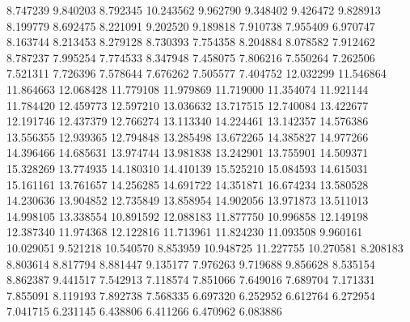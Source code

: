 8.747239
9.840203
8.792345
10.243562
9.962790
9.348402
9.426472
9.828913
8.199779
8.692475
8.221091
9.202520
9.189818
7.910738
7.955409
6.970747
8.163744
8.213453
8.279128
8.730393
7.754358
8.204884
8.078582
7.912462
8.787237
7.995254
7.774533
8.347948
7.458075
7.806216
7.550264
7.262506
7.521311
7.726396
7.578644
7.676262
7.505577
7.404752
12.032299
11.546864
11.864663
12.068428
11.779108
11.979869
11.719000
11.354074
11.921144
11.784420
12.459773
12.597210
13.036632
13.717515
12.740084
13.422677
12.191746
12.437379
12.766274
13.113340
14.224461
13.142357
14.576386
13.556355
12.939365
12.794848
13.285498
13.672265
14.385827
14.977266
14.396466
14.685631
13.974744
13.981838
13.242901
13.755901
14.509371
15.328269
13.774935
14.180310
14.410139
15.525210
15.084593
14.615031
15.161161
13.761657
14.256285
14.691722
14.351871
16.674234
13.580528
14.230636
13.904852
12.735849
13.858954
14.902056
13.971873
13.511013
14.998105
13.338554
10.891592
12.088183
11.877750
10.996858
12.149198
12.387340
11.974368
12.122816
11.713961
11.824230
11.093508
9.960161
10.029051
9.521218
10.540570
8.853959
10.948725
11.227755
10.270581
8.208183
8.803614
8.817794
8.881447
9.135177
7.976263
9.719688
9.856628
8.535154
8.862387
9.441517
7.542913
7.118574
7.851066
7.649016
7.689704
7.171331
7.855091
8.119193
7.892738
7.568335
6.697320
6.252952
6.612764
6.272954
7.041715
6.231145
6.438806
6.411266
6.470962
6.083886
